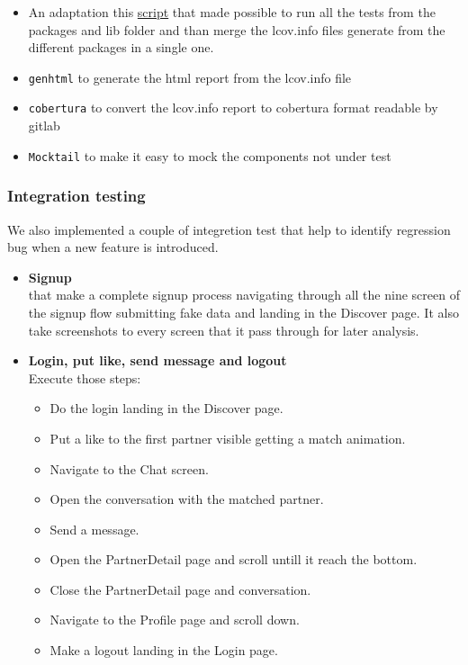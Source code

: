 \documentclass{article}
\begin{document}
\begin{itemize} 
	\item An adaptation this \href{https://github.com/brianegan/flutter_architecture_samples/blob/master/scripts/runTests.sh}{script} that made possible to run all the tests from the packages and lib folder and than merge the lcov.info files generate from the different packages in a single one.
	\item \texttt{genhtml} to generate the html report from the lcov.info file
	\item \texttt{cobertura} to convert the lcov.info report to cobertura format readable by gitlab
	\item \texttt{Mocktail} to make it easy to mock the components not under test
\end{itemize} 

\subsubsection{Integration testing}
We also implemented a couple of integretion test that help to identify regression bug when a new feature is introduced.
\begin{itemize} 
	\item \textbf{Signup} \\ that make a complete signup process navigating through all the nine screen of the signup flow submitting fake data and landing in the Discover page. It also take screenshots to every screen that it pass through for later analysis.
	\item \textbf{Login, put like, send message and logout}  \\ Execute those steps:
		\begin{itemize} 
			\item Do the login landing in the Discover page.
			\item Put a like to the first partner visible getting a match animation.
			\item Navigate to the Chat screen.
			\item Open the conversation with the matched partner.
			\item Send a message.
			\item Open the PartnerDetail page and scroll untill it reach the bottom.
			\item Close the PartnerDetail page and conversation.
			\item Navigate to the Profile page and scroll down.
			\item Make a logout landing in the Login page.
		\end{itemize}
\end{itemize} 
\end{document}
